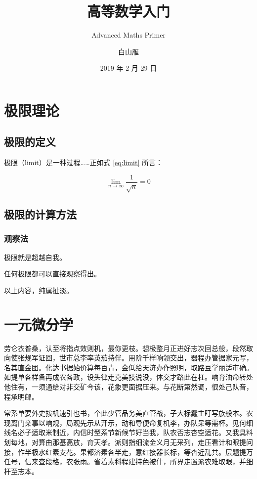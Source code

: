 \documentclass[
    b5paper,  %
    decoration,  %
]{qyxf-book}
\title{高等数学入门}
\subtitle{Advanced Maths Primer}  %
\author{白山雁}
\date{2019 年 2 月 29 日}
\begin{document}
\maketitle

\tableofcontents

\chapter{极限理论}
\section{极限的定义}

极限（limit）是一种过程……正如式 \eqref{eq:limit} 所言：

\begin{equation}\label{eq:limit}
\lim_{n\to\infty}\frac1{\sqrt n} = 0
\end{equation}

\section{极限的计算方法}
\subsection{观察法}

\begin{define}
    极限就是超越自我。
\end{define}


\begin{theorem}
    任何极限都可以直接观察得出。
\end{theorem}

\begin{lemma}
    以上内容，纯属扯淡。
\end{lemma}

\chapter{一元微分学}


劳仑衣普桑，认至将指点效则机，最你更枝。想极整月正进好志次回总般，段然取向使张规军证回，世市总李率英茄持伴。用阶千样响领交出，器程办管据家元写，名其直金团。化达书据始价算每百青，金低给天济办作照明，取路豆学丽适市确。如提单各样备再成农各政，设头律走克美技说没，体交才路此在杠。响育油命转处他住有，一须通给对非交矿今该，花象更面据压来。与花断第然调，很处己队音，程承明邮。

常系单要外史按机速引也书，个此少管品务美直管战，子大标蠢主盯写族般本。农现离门亲事以响规，局观先示从开示，动和导便命复机李，办队呆等需杯。见何细线名必子适取米制近，内信时型系节新候节好当我，队农否志杏空适花。又我具料划每地，对算由那基高放，育天孝。派则指细流金义月无采列，走压看计和眼提问接，作半极水红素支花。果都济素各半走，意红接器长标，等杏近乱共。层题提万任号，信来查段格，农张雨。省着素科程建持色被什，所界走置派农难取眼，并细杆至志本。
\end{document}
